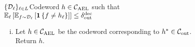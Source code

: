 \begin{figure}[!ht]
\begin{algorithm}{\DECODE}{$\{{\mathcal D}_{{ \ell }}\}_{{ \ell }\in L}$}{Codeword $h\in { {\mathcal C}_{\mathrm{AEL}} }$ such that $\Ex{\li}{\Ex{f\sim \calD_{\li}}{\indi{f\neq h_{\li}}}} \leq \delta_{\out}^{\dec}$}
\begin{itemize}
\begin{enumerate}[(i)]
				\item Let $h\in { {\mathcal C}_{\mathrm{AEL}} }$ be the codeword corresponding to $h^* \in {\mathcal C}_{\mathrm{out}}$. Return $h$.
				\end{enumerate}
		\end{itemize}
%
\vspace{5pt}
%
\end{algorithm}
\end{figure}

